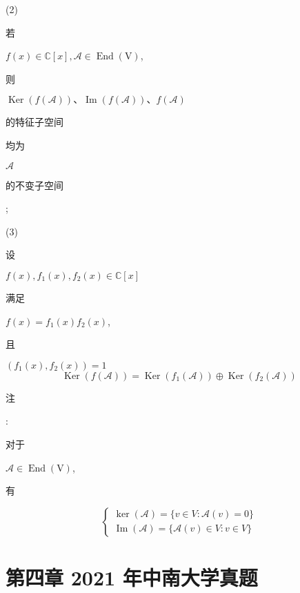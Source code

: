 \documentclass[10pt]{article}
\begin{document}
(2) \begin{CJK}{UTF8}{mj}若\end{CJK} $f(x) \in \mathbb{C}[x], \mathscr{A} \in \operatorname{End}(\mathrm{V})$, \begin{CJK}{UTF8}{mj}则\end{CJK} $\operatorname{Ker}(f(\mathscr{A})) 、 \operatorname{Im}(f(\mathscr{A})) 、 f(\mathscr{A})$ \begin{CJK}{UTF8}{mj}的特征子空间\end{CJK} \begin{CJK}{UTF8}{mj}均为\end{CJK} $\mathscr{A}$ \begin{CJK}{UTF8}{mj}的不变子空间\end{CJK};

(3) \begin{CJK}{UTF8}{mj}设\end{CJK} $f(x), f_{1}(x), f_{2}(x) \in \mathbb{C}[x]$ \begin{CJK}{UTF8}{mj}满足\end{CJK} $f(x)=f_{1}(x) f_{2}(x)$, \begin{CJK}{UTF8}{mj}且\end{CJK} $\left(f_{1}(x), f_{2}(x)\right)=1$
$$
\operatorname{Ker}(f(\mathscr{A}))=\operatorname{Ker}\left(f_{1}(\mathscr{A})\right) \oplus \operatorname{Ker}\left(f_{2}(\mathscr{A})\right)
$$
\begin{CJK}{UTF8}{mj}注\end{CJK}: \begin{CJK}{UTF8}{mj}对于\end{CJK} $\mathscr{A} \in \operatorname{End}(\mathrm{V})$, \begin{CJK}{UTF8}{mj}有\end{CJK}
$$
\left\{\begin{array}{l}
\operatorname{ker}(\mathscr{A})=\{v \in V: \mathscr{A}(v)=0\} \\
\operatorname{Im}(\mathscr{A})=\{\mathscr{A}(v) \in V: v \in V\}
\end{array}\right.
$$

\section{第四章 2021 年中南大学真题}
\end{document}
